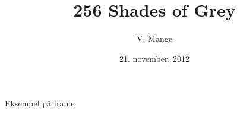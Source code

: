 \documentclass{beamer}
\title[Datamaskinprosjekt 2012 med fokus på ytelse: 256 Shades of Grey]{256
  Shades of Grey}
\institute[NTNU]{Department of Computer and Information Science}
\author{V. Mange}
\date{21. november, 2012}
\begin{document}
\ntnutitlepage

\begin{frame}
  Eksempel på frame
\end{frame}
\end{document}
